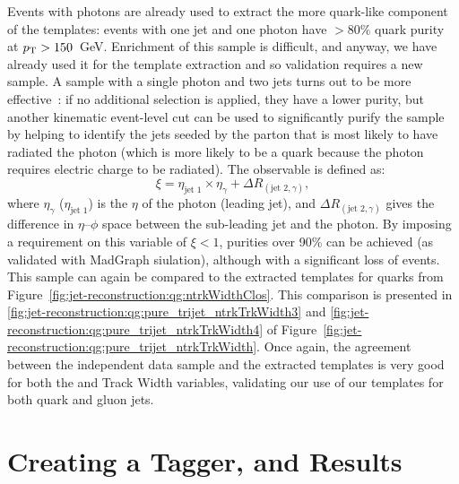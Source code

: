 Events with photons are already used to extract the more quark-like component of the templates: events with one jet and one photon have $>80\%$ quark purity at $p_{\text{T}} > 150$~GeV. Enrichment of this sample is difficult, and anyway, we have already used it for the template extraction and so validation requires a new sample. A sample with a single photon and two jets turns out to be more effective~\cite{schwartz2}: if no additional selection is applied, they have a lower purity, but another kinematic event-level cut can be used to significantly purify the sample by helping to identify the jets seeded by the parton that is most likely to have radiated the photon (which is more likely to be a quark because the photon requires electric charge to be radiated). The observable is defined as:
%
\begin{equation}
\xi=\eta_\text{jet~1}\times\eta_\gamma+\Delta R_{(\text{jet~2},\gamma)},
\end{equation}
%
where $\eta_\gamma$ ($\eta_\text{jet~1}$) is the $\eta$ of the photon (leading jet), and 
$\Delta R_{(\text{jet~2},\gamma)}$ gives the difference in $\eta$--$\phi$ space between the sub-leading 
jet and the photon. By imposing a requirement on this variable of $\xi < 1$, purities over 90\% can be achieved (as validated with MadGraph siulation), although with a significant loss of events. This sample can again be compared to the extracted templates for quarks from Figure~\ref{fig:jet-reconstruction:qg:ntrkWidthClos}. This comparison is presented in \ref{fig:jet-reconstruction:qg:pure_trijet_ntrkTrkWidth3} and \ref{fig:jet-reconstruction:qg:pure_trijet_ntrkTrkWidth4} of Figure~\ref{fig:jet-reconstruction:qg:pure_trijet_ntrkTrkWidth}. Once again, the agreement between the independent data sample and the extracted templates is very good for both the \ntrk and Track Width variables, validating our use of our templates for both quark and gluon jets.

\section{Creating a Tagger, and Results}

